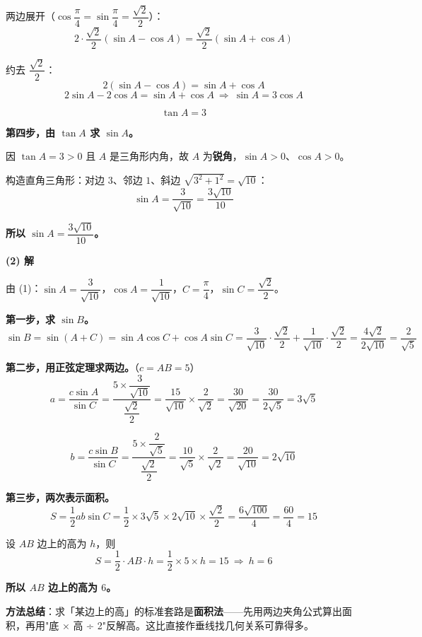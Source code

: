 两边展开（$\cos\dfrac\pi4=\sin\dfrac\pi4=\dfrac{\sqrt2}2$）：
\[2\cdot\frac{\sqrt2}2\left(\sin A-\cos A\right)=\frac{\sqrt2}2\left(\sin A+\cos A\right)\]

约去 $\dfrac{\sqrt2}2$：
\[2\left(\sin A-\cos A\right)=\sin A+\cos A\]
\[2\sin A-2\cos A=\sin A+\cos A\ \Longrightarrow\ \sin A=3\cos A\]

\[\tan A=3\]

\textbf{第四步，由 $\tan A$ 求 $\sin A$。}

因 $\tan A=3>0$ 且 $A$ 是三角形内角，故 $A$ 为\textbf{锐角}，$\sin A>0$、$\cos A>0$。

构造直角三角形：对边 $3$、邻边 $1$、斜边 $\sqrt{3^{2}+1^{2}}=\sqrt{10}$：
\[\sin A=\frac3{\sqrt{10}}=\frac{3\sqrt{10}}{10}\]

\textbf{所以 $\sin A=\dfrac{3\sqrt{10}}{10}$。}

\par\medskip

\textbf{(2) 解}

由 (1)：$\sin A=\dfrac3{\sqrt{10}}$，$\cos A=\dfrac1{\sqrt{10}}$，$C=\dfrac\pi4$，$\sin C=\dfrac{\sqrt2}2$。

\textbf{第一步，求 $\sin B$。}
\[\sin B=\sin(A+C)=\sin A\cos C+\cos A\sin C=\frac3{\sqrt{10}}\cdot\frac{\sqrt2}2+\frac1{\sqrt{10}}\cdot\frac{\sqrt2}2=\frac{4\sqrt2}{2\sqrt{10}}=\frac{2}{\sqrt5}\]

\textbf{第二步，用正弦定理求两边。}（$c=AB=5$）
\[a=\frac{c\sin A}{\sin C}=\frac{5\times\dfrac3{\sqrt{10}}}{\dfrac{\sqrt2}2}=\frac{15}{\sqrt{10}}\times\frac2{\sqrt2}=\frac{30}{\sqrt{20}}=\frac{30}{2\sqrt5}=3\sqrt5\]

\[b=\frac{c\sin B}{\sin C}=\frac{5\times\dfrac2{\sqrt5}}{\dfrac{\sqrt2}2}=\frac{10}{\sqrt5}\times\frac2{\sqrt2}=\frac{20}{\sqrt{10}}=2\sqrt{10}\]

\textbf{第三步，两次表示面积。}
\[S=\frac12ab\sin C=\frac12\times3\sqrt5\times2\sqrt{10}\times\frac{\sqrt2}2=\frac{6\sqrt{100}}4=\frac{60}4=15\]

设 $AB$ 边上的高为 $h$，则
\[S=\frac12\cdot AB\cdot h=\frac12\times5\times h=15\ \Longrightarrow\ h=6\]

\textbf{所以 $AB$ 边上的高为 $6$。}

\begin{gktip}
\textbf{方法总结}：求「某边上的高」的标准套路是\textbf{面积法}——先用两边夹角公式算出面积，再用"底 × 高 ÷ 2"反解高。这比直接作垂线找几何关系可靠得多。
\end{gktip}

\par\medskip

